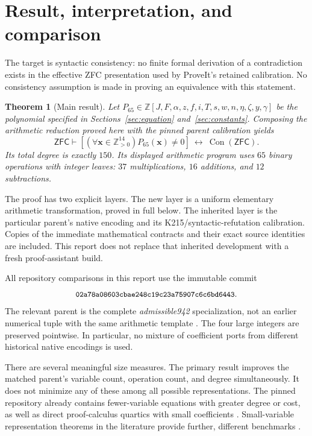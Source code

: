 \documentclass[11pt,letterpaper]{article}
\newtheorem{theorem}{Theorem}[section]
\theoremstyle{definition}
\newcommand{\Z}{\mathbb Z}
\newcommand{\Zp}{\mathbb Z_{>0}}
\newcommand{\ZFC}{\mathsf{ZFC}}
\newcommand{\Con}{\operatorname{Con}}
\begin{document}
\section{Result, interpretation, and comparison}

The target is syntactic consistency: no finite formal derivation of a
contradiction exists in the effective ZFC presentation used by ProveIt's
retained calibration. No consistency assumption is made in proving an
equivalence with this statement.

\begin{theorem}[Main result]\label{thm:main}
Let \(P_{65}\in\Z[J,F,\alpha,z,f,i,T,s,w,n,\eta,\zeta,y,\gamma]\) be the
polynomial specified in Sections~\ref{sec:equation} and~\ref{sec:constants}.
Composing the arithmetic reduction proved here with the pinned parent
calibration yields
\[
 \ZFC\vdash
 \left[
   \left(\forall \mathbf x\in\Zp^{14}\right)P_{65}(\mathbf x)\ne0
 \right]\ \longleftrightarrow\ \Con(\ZFC).
\]
Its total degree is exactly \(150\). Its displayed arithmetic program
uses \(65\) binary operations with integer leaves: \(37\) multiplications,
\(16\) additions, and \(12\) subtractions.
\end{theorem}

The proof has two explicit layers. The new layer is a uniform elementary
arithmetic transformation, proved in full below. The inherited layer is the
particular parent's native encoding and its K215/syntactic-refutation
calibration. Copies of the immediate mathematical contracts and their exact
source identities are included. This report does not replace that inherited
development with a fresh proof-assistant build.

All repository comparisons in this report use the immutable commit
\[
 \texttt{\small 02a78a08603cbae248c19c23a75907c6c6bd6443}.
\]
The relevant parent is the complete \emph{admissible942} specialization,
not an earlier numerical tuple with the same arithmetic template
\cite{current,native}. The four large integers are preserved pointwise.
In particular, no mixture of coefficient ports from different historical
native encodings is used.

There are several meaningful size measures. The primary result improves
the matched parent's variable count, operation count, and degree
simultaneously. It does not minimize any of these among all possible
representations. The pinned repository already contains fewer-variable
equations with greater degree or cost, as well as direct proof-calculus
quartics with small coefficients \cite{collection,direct}. Small-variable
representation theorems in the literature provide further, different
benchmarks \cite{MR,Sun}.
\end{document}
